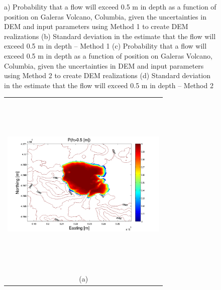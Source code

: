 \documentclass[12pt]{article}
\newcommand{\Pic}[2][0.85]{\begin{center}\texttt{[image: \#2]}
 \end{center} }
\begin{document}
\begin{figure}[H]
\begin{minipage}{0.6\textwidth}
    \end{minipage} 
    \caption{a) Probability that a flow will exceed 0.5 m in depth as
      a function of position on Galeras Volcano, Columbia, given the
      uncertainties in DEM and input parameters using Method 1 to
      create DEM realizations (b) Standard deviation in the estimate
      that the flow will exceed 0.5 m in depth -- Method 1 (c)
      Probability that a flow will exceed 0.5 m in depth as a function
      of position on Galeras Volcano, Columbia, given the
      uncertainties in DEM and input parameters using Method 2 to
      create DEM realizations (d) Standard deviation in the estimate
      that the flow will exceed 0.5 m in depth -- Method 2}
\label{fig3}  
\end{figure}

\begin{figure}[H]
    \begin{minipage}[b]{0.6\textwidth}
        \begin{tabular}{c}
       \includegraphics[width=8cm,height=9cm,keepaspectratio]{Mammoth_0_P.pdf}\\
        (a)
        \end{tabular}
    \end{minipage}
    \begin{minipage}{0.6\textwidth}
        \begin{tabular}{c}

\end{tabular}
\end{minipage}
\end{figure}
\end{document}
